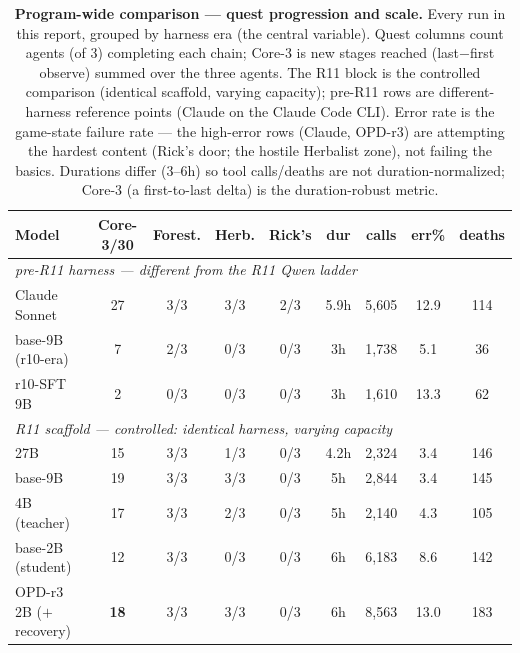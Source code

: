 \documentclass[11pt]{article}
\begin{document}
\begin{table}[t]
\centering\small
\setlength{\tabcolsep}{4.5pt}
\caption{\textbf{Program-wide comparison --- quest progression and scale.} Every run in this report,
grouped by harness era (the central variable). Quest columns count agents (of 3) completing each
chain; Core-3 is new stages reached (last$-$first observe) summed over the three agents. The R11
block is the controlled comparison (identical scaffold, varying capacity); pre-R11 rows are
different-harness reference points (Claude on the Claude Code CLI). Error rate is the game-state
failure rate --- the high-error rows (Claude, OPD-r3) are attempting the hardest content (Rick's
door; the hostile Herbalist zone), not failing the basics. Durations differ (3--6h) so tool
calls/deaths are not duration-normalized; Core-3 (a first-to-last delta) is the duration-robust
metric.}
\label{tab:compare-progress}
\begin{tabular}{lcccccccc}
\toprule
Model & Core-3/30 & Forest. & Herb. & Rick's & dur & calls & err\% & deaths \\
\midrule
\multicolumn{9}{l}{\emph{pre-R11 harness --- different from the R11 Qwen ladder}} \\
\quad Claude Sonnet & 27 & 3/3 & 3/3 & 2/3 & 5.9h & 5{,}605 & 12.9 & 114 \\
\quad base-9B (r10-era) & 7 & 2/3 & 0/3 & 0/3 & 3h & 1{,}738 & 5.1 & 36 \\
\quad r10-SFT 9B & 2 & 0/3 & 0/3 & 0/3 & 3h & 1{,}610 & 13.3 & 62 \\
\midrule
\multicolumn{9}{l}{\emph{R11 scaffold --- controlled: identical harness, varying capacity}} \\
\quad 27B & 15 & 3/3 & 1/3 & 0/3 & 4.2h & 2{,}324 & 3.4 & 146 \\
\quad base-9B & 19 & 3/3 & 3/3 & 0/3 & 5h & 2{,}844 & 3.4 & 145 \\
\quad 4B (teacher) & 17 & 3/3 & 2/3 & 0/3 & 5h & 2{,}140 & 4.3 & 105 \\
\quad base-2B (student) & 12 & 3/3 & 0/3 & 0/3 & 6h & 6{,}183 & 8.6 & 142 \\
\quad OPD-r3 2B ($+$recovery) & \textbf{18} & 3/3 & 3/3 & 0/3 & 6h & 8{,}563 & 13.0 & 183 \\
\bottomrule
\end{tabular}
\end{table}
\end{document}
